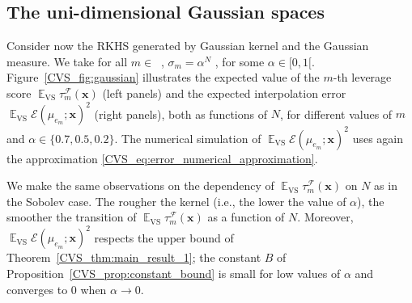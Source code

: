 \documentclass[twoside,11pt]{book}
\numberwithin{theorem}{chapter}
\numberwithin{definition}{chapter}
\numberwithin{proposition}{chapter}
\numberwithin{corollary}{chapter}
\numberwithin{example}{chapter}
\numberwithin{lemma}{chapter}
\numberwithin{assumption}{chapter}
\numberwithin{equation}{chapter}
\numberwithin{figure}{chapter}
\DeclareMathOperator{\VS}{\mathrm{VS}}
\DeclareMathOperator{\EX}{\mathbb{E}}
\DeclareMathOperator{\F}{\mathcal{F}}
\DeclareMathOperator{\Ns}{\mathbb{N}^{*}}
\begin{document}

\subsection{The uni-dimensional Gaussian spaces}

Consider now the RKHS generated by Gaussian kernel and the Gaussian measure. We take for all $m \in \Ns$, $\sigma_{m}=\alpha^{N}$  \citep{ZhWiRoMo97}, for some $\alpha \in [0,1[$.
Figure~\ref{CVS_fig:gaussian} illustrates the expected value of the $m$-th leverage score $\EX_{\VS} \tau_{m}^{\F}(\bm{x})$ (left panels) and the expected interpolation error $\EX_{\VS} \mathcal{E}(\mu_{e_{m}};\bm{x})^{2}$ (right panels), both as functions of $N$, for different values of $m$ and $\alpha \in \{0.7,0.5,0.2\}$. The numerical simulation of 
$\EX_{\VS} \mathcal{E}(\mu_{e_{m}};\bm{x})^{2}$ uses again the approximation \eqref{CVS_eq:error_numerical_approximation}.

We make the same observations on the dependency of $\EX_{\VS} \tau_{m}^{\F}(\bm{x})$ on $N$ as in the Sobolev case. The rougher the kernel (i.e., the lower the value of $\alpha$), the smoother the transition of $\EX_{\VS} \tau_{m}^{\F}(\bm{x})$ as a function of $N$. Moreover, $\EX_{\VS} \mathcal{E}(\mu_{e_{m}};\bm{x})^{2}$ respects the upper bound of Theorem~\ref{CVS_thm:main_result_1};
the constant $B$ of Proposition~\ref{CVS_prop:constant_bound} is small for low values of $\alpha$ and converges to $0$ when $\alpha \rightarrow 0$.
\end{document}
